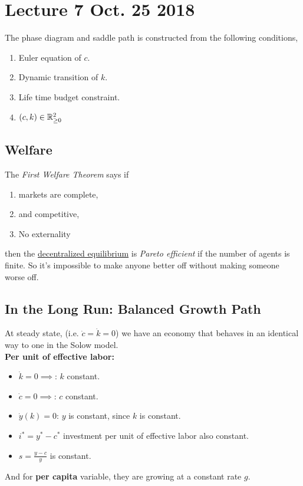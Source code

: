 \documentclass[]{article}
\begin{document}
	\section{Lecture 7 Oct. 25 2018}
		\begin{remark} The phase diagram and saddle path is constructed from the following conditions,
			\begin{enumerate}
				\item Euler equation of $c$. 
				\item Dynamic transition of $k$.
				\item Life time budget constraint.
				\item $(c,k) \in \mathbb{R}_{\geq 0}^2$
			\end{enumerate}
		\end{remark}
		
		\subsection{Welfare}
			\par The \emph{First Welfare Theorem} says if 
			\begin{enumerate}
				\item markets are complete,
				\item and competitive,
				\item No externality
			\end{enumerate} then the \ul{decentralized equilibrium} is \emph{Pareto efficient} if the number of agents is finite. So it's impossible to make anyone better off without making someone worse off.
		
		\subsection{In the Long Run: Balanced Growth Path}
			\par At steady state, (i.e. $\dot{c}=\dot{k}=0$) we have an economy that behaves in an identical way to one in the Solow model. \\
			\textbf{Per unit of effective labor: } 
			\begin{itemize}
				\item $\dot{k}=0\implies$: $k$ constant.
				\item $\dot{c}=0\implies$: $c$ constant.
				\item $\dot{y}(k)=0$: $y$ is constant, since $k$ is constant.
				\item $i^* = y^* - c^*$ investment per unit of effective labor also constant.
				\item $s = \frac{y-c}{y}$ is constant.
			\end{itemize}
			And for \textbf{per capita} variable, they are growing at a constant rate $g$.
			
\end{document}
